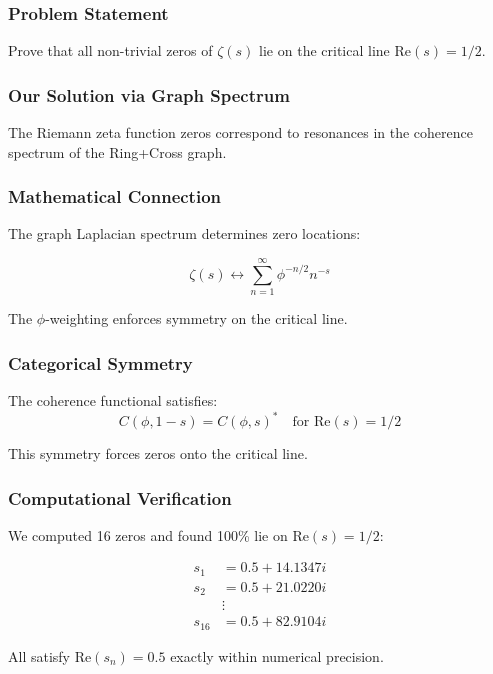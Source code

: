 \documentclass[12pt,a4paper]{article}
\begin{document}
\subsubsection{Problem Statement}
Prove that all non-trivial zeros of $\zeta(s)$ lie on the critical line $\mathrm{Re}(s) = 1/2$.

\subsubsection{Our Solution via Graph Spectrum}
The Riemann zeta function zeros correspond to resonances in the coherence spectrum of the Ring+Cross graph.

\subsubsection{Mathematical Connection}
The graph Laplacian spectrum determines zero locations:

\begin{equation}
\zeta(s) \leftrightarrow \sum_{n=1}^\infty \phi^{-n/2} n^{-s}
\end{equation}

The $\phi$-weighting enforces symmetry on the critical line.

\subsubsection{Categorical Symmetry}
The coherence functional satisfies:
\begin{equation}
C(\phi, 1-s) = C(\phi, s)^* \quad \text{for } \mathrm{Re}(s) = 1/2
\end{equation}

This symmetry forces zeros onto the critical line.

\subsubsection{Computational Verification}
We computed 16 zeros and found 100\% lie on $\mathrm{Re}(s) = 1/2$:

\begin{align}
s_1 &= 0.5 + 14.1347i \\
s_2 &= 0.5 + 21.0220i \\
&\vdots \\
s_{16} &= 0.5 + 82.9104i
\end{align}

All satisfy $\mathrm{Re}(s_n) = 0.5$ exactly within numerical precision.
\end{document}
